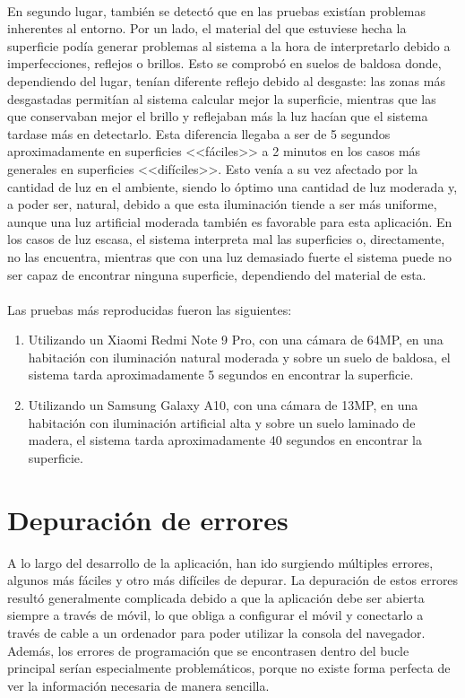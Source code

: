 \documentclass{subfiles}
\begin{document}
    \paragraph{}
    En segundo lugar, también se detectó que en las pruebas existían problemas inherentes al entorno. Por un lado, el material del que estuviese hecha la superficie podía generar problemas al sistema a la hora de interpretarlo debido a imperfecciones, reflejos o brillos. Esto se comprobó en suelos de baldosa donde, dependiendo del lugar, tenían diferente reflejo debido al desgaste: las zonas más desgastadas permitían al sistema calcular mejor la superficie, mientras que las que conservaban mejor el brillo y reflejaban más la luz hacían que el sistema tardase más en detectarlo. Esta diferencia llegaba a ser de 5 segundos aproximadamente en superficies <<fáciles>> a 2 minutos en los casos más generales en superficies <<difíciles>>. Esto venía a su vez afectado por la cantidad de luz en el ambiente, siendo lo óptimo una cantidad de luz moderada y, a poder ser, natural, debido a que esta iluminación tiende a ser más uniforme, aunque una luz artificial moderada también es favorable para esta aplicación. En los casos de luz escasa, el sistema interpreta mal las superficies o, directamente, no las encuentra, mientras que con una luz demasiado fuerte el sistema puede no ser capaz de encontrar ninguna superficie, dependiendo del material de esta.

    \paragraph{}
    Las pruebas más reproducidas fueron las siguientes:
    \begin{enumerate}
        \item Utilizando un Xiaomi Redmi Note 9 Pro, con una cámara de 64MP, en una habitación con iluminación natural moderada y sobre un suelo de baldosa, el sistema tarda aproximadamente 5 segundos en encontrar la superficie.
        \item Utilizando un Samsung Galaxy A10, con una cámara de 13MP, en una habitación con iluminación artificial alta y sobre un suelo laminado de madera, el sistema tarda aproximadamente 40 segundos en encontrar la superficie.
    \end{enumerate}

    \section{Depuración de errores}
    \label{sec:5.3}
    A lo largo del desarrollo de la aplicación, han ido surgiendo múltiples errores, algunos más fáciles y otro más difíciles de depurar. La depuración de estos errores resultó generalmente complicada debido a que la aplicación debe ser abierta siempre a través de móvil, lo que obliga a configurar el móvil y conectarlo a través de cable a un ordenador para poder utilizar la consola del navegador. Además, los errores de programación que se encontrasen dentro del bucle principal serían especialmente problemáticos, porque no existe forma perfecta de ver la información necesaria de manera sencilla.
\end{document}
